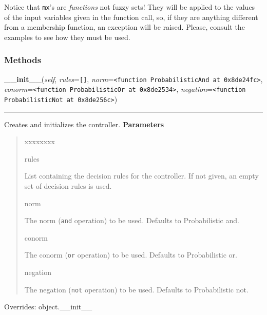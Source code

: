 Notice that \texttt{mx}'s are \emph{functions} not fuzzy sets! They will be applied to
the values of the input variables given in the function call, so, if they
are anything different from a membership function, an exception will be
raised. Please, consult the examples to see how they must be used.


  \subsubsection{Methods}

    \vspace{0.5ex}

\hspace{.8\funcindent}\begin{boxedminipage}{\funcwidth}

    \raggedright \textbf{\_\_init\_\_}(\textit{self}, \textit{rules}={\tt \texttt{[}\texttt{]}}, \textit{norm}={\tt {\textless}function ProbabilisticAnd at 0x8de24fc{\textgreater}}, \textit{conorm}={\tt {\textless}function ProbabilisticOr at 0x8de2534{\textgreater}}, \textit{negation}={\tt {\textless}function ProbabilisticNot at 0x8de256c{\textgreater}})

    \vspace{-1.5ex}

    \rule{\textwidth}{0.5\fboxrule}
\setlength{\parskip}{2ex}

Creates and initializes the controller.
\setlength{\parskip}{1ex}
      \textbf{Parameters}
      \vspace{-1ex}

      \begin{quote}
        \begin{Ventry}{xxxxxxxx}

          \item[rules]


List containing the decision rules for the controller. If not given,
an empty set of decision rules is used.
          \item[norm]


The norm (\texttt{and} operation) to be used. Defaults to Probabilistic
and.
          \item[conorm]


The conorm (\texttt{or} operation) to be used. Defaults to Probabilistic
or.
          \item[negation]


The negation (\texttt{not} operation) to be used. Defaults to
Probabilistic not.
        \end{Ventry}

      \end{quote}

      Overrides: object.\_\_init\_\_

    \end{boxedminipage}

